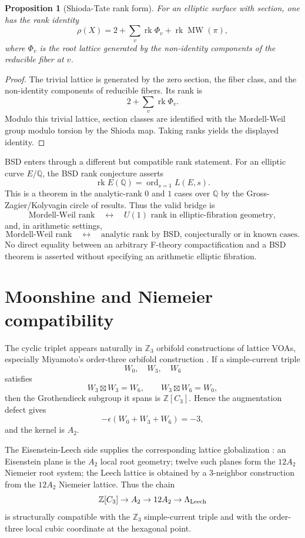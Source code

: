 \documentclass[11pt]{amsart}
\newtheorem{proposition}[theorem]{Proposition}
\DeclareMathOperator{\MW}{MW}
\newcommand{\ZZ}{\mathbb Z}
\newcommand{\QQ}{\mathbb Q}
\newcommand{\rk}{\operatorname{rk}}
\begin{document}
\begin{proposition}[Shioda-Tate rank form]
For an elliptic surface with section, one has the rank identity
\[
       \rho(X)=2+\sum_v \rk \Phi_v+\rk \MW(\pi),
\]
where $\Phi_v$ is the root lattice generated by the non-identity components of the reducible fiber at $v$.
\end{proposition}

\begin{proof}
The trivial lattice is generated by the zero section, the fiber class, and the non-identity components of reducible fibers.  Its rank is
\[
       2+
       \sum_v \rk\Phi_v.
\]
Modulo this trivial lattice, section classes are identified with the Mordell-Weil group modulo torsion by the Shioda map.  Taking ranks yields the displayed identity.\end{proof}

BSD enters through a different but compatible rank statement.  For an elliptic curve $E/\QQ$, the BSD rank conjecture asserts
\[
       \rk E(\QQ)=\operatorname{ord}_{s=1}L(E,s).
\]
This is a theorem in the analytic-rank $0$ and $1$ cases over $\QQ$ by the Gross-Zagier/Kolyvagin circle of results.  Thus the valid bridge is
\[
       \text{Mordell-Weil rank}
       \quad\leftrightarrow\quad
       U(1)\text{ rank in elliptic-fibration geometry},
\]
and, in arithmetic settings,
\[
       \text{Mordell-Weil rank}
       \quad\leftrightarrow\quad
       \text{analytic rank by BSD, conjecturally or in known cases}.
\]
No direct equality between an arbitrary F-theory compactification and a BSD theorem is asserted without specifying an arithmetic elliptic fibration.

\section{Moonshine and Niemeier compatibility}

The cyclic triplet appears naturally in $\ZZ_3$ orbifold constructions of lattice VOAs, especially Miyamoto's order-three orbifold construction \cite{miyamoto}.  If a simple-current triple
\[
       W_0,
       \quad W_3,
       \quad W_6
\]
satisfies
\[
       W_3\boxtimes W_3=W_6,
       \qquad
       W_3\boxtimes W_6=W_0,
\]
then the Grothendieck subgroup it spans is $\ZZ[C_3]$.  Hence the augmentation defect gives
\[
       -\epsilon(W_0+W_3+W_6)=-3,
\]
and the kernel is $A_2$.

The Eisenstein-Leech side supplies the corresponding lattice globalization \cite{eisensteinleech,umbral,linear-codes}: an Eisenstein plane is the $A_2$ local root geometry; twelve such planes form the $12A_2$ Niemeier root system; the Leech lattice is obtained by a $3$-neighbor construction from the $12A_2$ Niemeier lattice.  Thus the chain
\[
       \ZZ[C_3]\to A_2\to 12A_2\to \Lambda_{\rm Leech}
\]
is structurally compatible with the $\ZZ_3$ simple-current triple and with the order-three local cubic coordinate at the hexagonal point.
\end{document}
